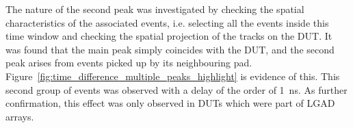 The nature of the second peak was investigated by checking the spatial characteristics of the associated events, i.e. selecting all the events inside this time window and checking the spatial projection of the tracks on the DUT. It was found that the main peak simply coincides with the DUT, and the second peak arises from events picked up by its neighbouring pad. Figure~\ref{fig:time_difference_multiple_peaks_highlight} is evidence of this. This second group of events was observed with a delay of the order of \qty{1}{\nano\second}.
As further confirmation, this effect was only observed in DUTs which were part of LGAD arrays.

\begin{figure}[h!tbp]
    \centering
    \\ [\smallskipamount]

\end{figure}
